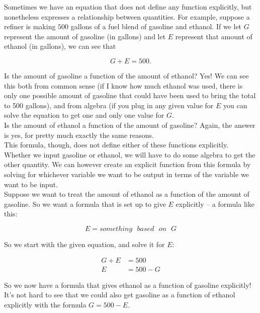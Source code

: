 Sometimes we have an equation that does not define any function explicitly, but nonetheless expresses a relationship between quantities. For example, suppose a refiner is making $500$ gallons of a fuel blend of gasoline and ethanol. If we let $G$ represent the amount of gasoline (in
gallons) and let $E$ represent that amount of ethanol (in gallons), we can see that

\begin{equation*}
	G+E=500.
\end{equation*}

Is the amount of gasoline a function of the amount of ethanol? Yes! We can see this both from common sense (if I know how much ethanol was used, there is only one possible amount of gasoline that could have been used to bring the total to 500 gallons), and from algebra (if you plug in any given value for $E$ you can solve the equation to get one and only one value for $G$.\\

Is the amount of ethanol a function of the amount of gasoline? Again, the answer is yes, for pretty much exactly the same reasons.\\

This formula, though, does not define either of these functions explicitly. Whether we input gasoline or ethanol, we will have to do some algebra to get the other quantity. We can however create an explicit function from this formula by solving for whichever variable we want to be output in terms of the variable we want to be input.\\

Suppose we want to treat the amount of ethanol as a function of the amount of gasoline. So we want a formula that is set up to give $E$ explicitly – a formula like this:

\begin{equation*}
	E = something \text{ } based \text{ } on \text{ } G 
\end{equation*}

So we start with the given equation, and solve it for $E$:

\begin{align*}
	G+E&=500\\
	E&=500-G
\end{align*}

So we now have a formula that gives ethanol as a function of gasoline explicitly!\\

It’s not hard to see that we could also get gasoline as a function of ethanol explicitly with the formula $G=500-E$.

